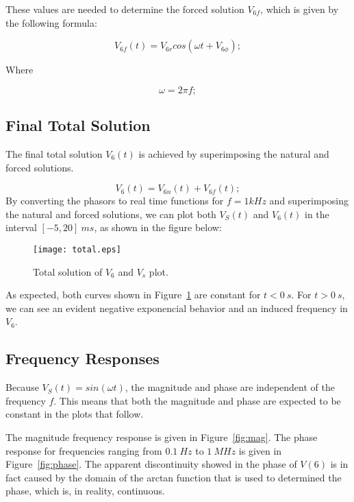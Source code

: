 These values are needed to determine the forced solution $V_{6f}$, which is given by the following formula:

\begin{equation}
V_{6f}(t)=V_{6r}cos(\omega t+V_{6\phi});
\end{equation}

Where

\begin{equation}
\omega=2\pi f;
\end{equation}


\subsection{Final Total Solution}


The final total solution $V_6(t)$ is achieved by superimposing the natural and forced solutions. 



\begin{equation}
	V_6(t)=V_{6n}(t)+V_{6f}(t);
\end{equation}
\newpage
By converting the phasors to real time functions for $f = 1 kHz$ and superimposing the natural and forced solutions, we can plot both $V_S(t)$ and $V_6(t)$ in the interval $[-5, 20]~ms$, as shown in the figure below:


\begin{figure}[h] \centering
\texttt{[image: total.eps]}
\caption{Total solution of $V_{6}$ and $V_{s}$ plot.}
	\label{fig:total}
\end{figure}

As expected, both curves shown in Figure~\ref{fig:total} are constant for $t<0~s$. For $t>0~s$, we can see an evident negative exponencial behavior and an induced frequency in $V_{6}$.


\subsection{Frequency Responses}

Because $V_S(t) = sin(\omega t)$, the magnitude and phase are independent of the frequency $f$. This means that both the magnitude and phase are expected to be constant in the plots that follow.

The magnitude frequency response is given in Figure~\ref{fig:mag}.
The phase response for frequencies ranging from $0.1~Hz$ to $1~MHz$ is given in Figure~\ref{fig:phase}. The apparent discontinuity showed in the phase of $V(6)$ is in fact caused by the domain of the arctan function that is used to determined the phase, which is, in reality, continuous.

